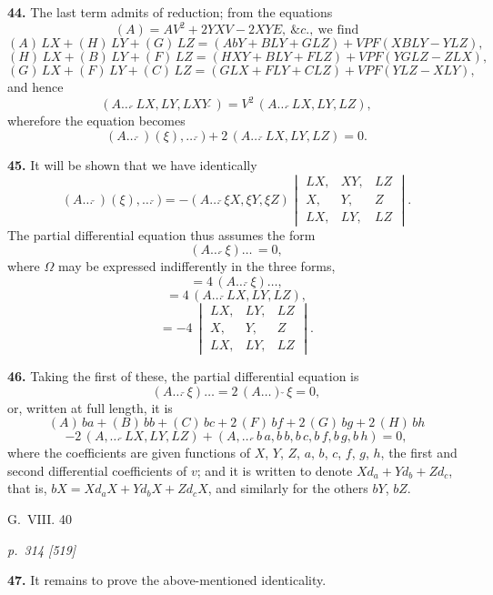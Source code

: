 \documentclass[11pt,a4paper]{book}
\begin{document}
\textbf{44.} The last term admits of reduction; from the equations
\[
(A) = AV^2 + 2YXV - 2XYE,\ \&c.,\ \text{we find}
\]
\[
(A)\,LX + (H)\,LY + (G)\,LZ = (AbY + BLY + GLZ) + VPF(XBLY - YLZ),
\]
\[
(H)\,LX + (B)\,LY + (F)\,LZ = (HXY + BLY + FLZ) + VPF(YGLZ - ZLX),
\]
\[
(G)\,LX + (F)\,LY + (C)\,LZ = (GLX + FLY + CLZ) + VPF(YLZ - XLY),
\]
and hence
\[
(A\ldots\,\check{}\,LX, LY, LXY\,\check{}\,) = V^2\,(A\ldots\,\check{}\,LX, LY, LZ),
\]
wherefore the equation becomes
\[
(A\ldots\,\check{}\,)(\xi),\ldots\,\check{}\,) + 2\,(A\ldots\,\check{}\,LX, LY, LZ) = 0.
\]

\textbf{45.} It will be shown that we have identically
\[
(A\ldots\,\check{}\,)(\xi),\ldots\,\check{}\,) = -(A\ldots\,\check{}\,\xi X, \xi Y, \xi Z)\begin{vmatrix} LX, & XY, & LZ \\ X, & Y, & Z \\ LX, & LY, & LZ \end{vmatrix}.
\]
The partial differential equation thus assumes the form
\[
(A\ldots\,\check{}\,\xi)\ldots\,= 0,
\]
where $\Omega$ may be expressed indifferently in the three forms,
\[
= 4\,(A\ldots\,\check{}\,\xi)\ldots,
\]
\[
= 4\,(A\ldots\,\check{}\,LX, LY, LZ),
\]
\[
= -4\,\begin{vmatrix} LX, & LY, & LZ \\ X, & Y, & Z \\ LX, & LY, & LZ \end{vmatrix}.
\]

\textbf{46.} Taking the first of these, the partial differential equation is
\[
(A\ldots\,\check{}\,\xi)\ldots = 2\,(A\ldots)\,\check{}\,\xi = 0,
\]
or, written at full length, it is
\[
(A)\,b a + (B)\,b b + (C)\,b c + 2\,(F)\,b f + 2\,(G)\,b g + 2\,(H)\,b h
\]
\[
- 2\,(A,\ldots\,\check{}\,LX, LY, LZ) + (A,\ldots\,\check{}\,b\,a, b\,b, b\,c, b\,f, b\,g, b\,h) = 0,
\]
where the coefficients are given functions of $X$, $Y$, $Z$, $a$, $b$, $c$, $f$, $g$, $h$, the first and second differential coefficients of $v$; and it is written to denote $Xd_{a} + Yd_{b} + Zd_{c}$, that is, $bX = Xd_{a}X + Yd_{b}X + Zd_{c}X$, and similarly for the others $bY$, $bZ$.

\hfill G.\ VIII. \hfill 40

\clearpage

\bigskip
\textit{p.~314 [519]}
\smallskip

\textbf{47.} It remains to prove the above-mentioned identicality.
\end{document}
